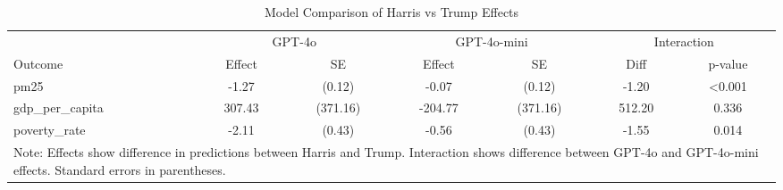 \begin{table}[htbp]
\centering
\caption{Model Comparison of Harris vs Trump Effects}
\begin{tabular}{lcccccc}
\hline
& \multicolumn{2}{c}{GPT-4o} & \multicolumn{2}{c}{GPT-4o-mini} & \multicolumn{2}{c}{Interaction} \\
Outcome & Effect & SE & Effect & SE & Diff & p-value \\
\hline
pm25 & -1.27 & (0.12) & -0.07 & (0.12) & -1.20 & <0.001 \\
gdp_per_capita & 307.43 & (371.16) & -204.77 & (371.16) & 512.20 & 0.336 \\
poverty_rate & -2.11 & (0.43) & -0.56 & (0.43) & -1.55 & 0.014 \\
\hline
\multicolumn{7}{p{0.8\textwidth}}{\small Note: Effects show difference in predictions between Harris and Trump. 
Interaction shows difference between GPT-4o and GPT-4o-mini effects. Standard errors in parentheses.} \\
\end{tabular}
\label{tab:model_comparison}
\end{table}